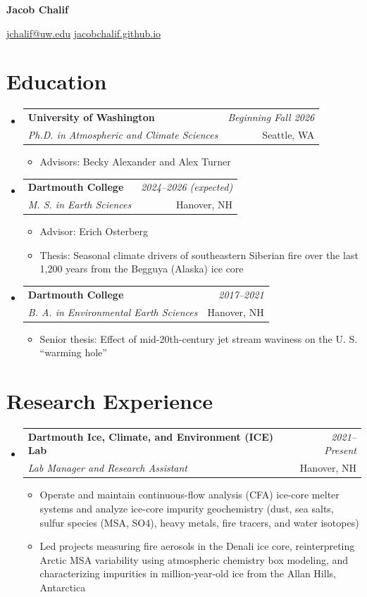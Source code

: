 \documentclass[a4paper,11pt]{article}
\makeatletter
\newcommand{\resumeSubheading}[4]{
\vspace{0.5mm}\item
    \begin{tabular*}{0.98\textwidth}[t]{l@{\extracolsep{\fill}}r}
        \textbf{#1} & \textit{\small{#4}} \\
        \textit{\small{#3}} &  \small{#2}\\
    \end{tabular*}
    \vspace{-2.4mm}
}
\newcommand{\resumeItemListStart}{\begin{itemize}[leftmargin=*,labelsep=1mm,itemsep=0.5mm]}
\newcommand{\resumeItemListEnd}{\end{itemize}\vspace{-2mm}}
\newcommand{\headerfontiii}{\fontfamily{ppl}\selectfont} %
\makeatother
\begin{document}
\headerfontiii
\begin{center}
    {\Huge\textbf{Jacob Chalif}}
\end{center}
\vspace{-6mm}
\begin{center}
    \small{\href{mailto:jchalif@uw.edu}{jchalif@uw.edu} \;\textbullet{}\; \href{https://jacobchalif.github.io}{jacobchalif.github.io}}
\end{center}
\vspace{-4mm}

\section{\textbf{Education}}
\begin{itemize}[leftmargin=0pt,label={},labelsep=0pt]
\resumeSubheading
{University of Washington}{Seattle, WA}
{Ph.D. in Atmospheric and Climate Sciences}{Beginning Fall 2026}
\small{
\resumeItemListStart
  \item Advisors: Becky Alexander and Alex Turner
\resumeItemListEnd
}

\resumeSubheading
{Dartmouth College}{Hanover, NH}
{M. S. in Earth Sciences}{2024--2026 (expected)}
\small{
\resumeItemListStart
  \item Advisor: Erich Osterberg
  \item Thesis: Seasonal climate drivers of southeastern Siberian fire over the last 1,200 years from the Begguya (Alaska) ice core
\resumeItemListEnd
}

\resumeSubheading
{Dartmouth College}{Hanover, NH}
{B. A. in Environmental Earth Sciences}{2017--2021}
\small{
\resumeItemListStart
  \item Senior thesis: Effect of mid-20th-century jet stream waviness on the U. S. ``warming hole''
\resumeItemListEnd
}
\end{itemize}

\section{\textbf{Research Experience}}
\begin{itemize}[leftmargin=0pt,label={},labelsep=0pt]
\resumeSubheading
{Dartmouth Ice, Climate, and Environment (ICE) Lab}{Hanover, NH}
{Lab Manager and Research Assistant}{2021--Present}
\small{
\resumeItemListStart
  \item Operate and maintain continuous-flow analysis (CFA) ice-core melter systems and analyze ice-core impurity geochemistry (dust, sea salts, sulfur species (MSA, SO4), heavy metals, fire tracers, and water isotopes)
  \item Led projects measuring fire aerosols in the Denali ice core, reinterpreting Arctic MSA variability using atmospheric chemistry box modeling, and characterizing impurities in million-year-old ice from the Allan Hills, Antarctica
\resumeItemListEnd
}
\end{itemize}
\end{document}
